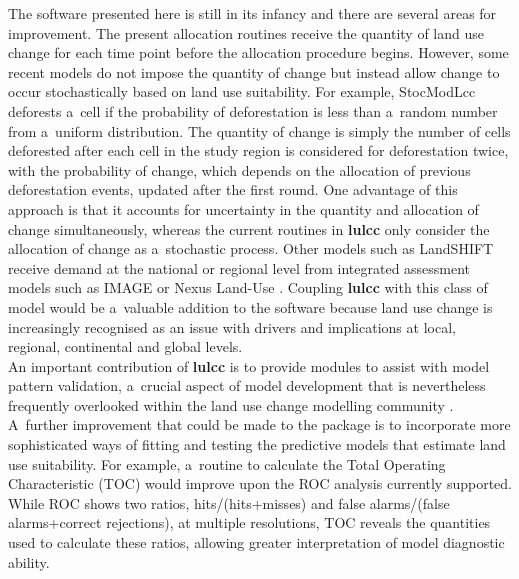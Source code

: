 \documentclass[gmdd, online, hvmath]{copernicus}
\begin{document}
The software presented here is still in its infancy and there are several areas for improvement. The present allocation routines receive the quantity of land use change for each time point before the allocation procedure begins. However, some recent models do not impose the quantity of change but instead allow change to occur stochastically based on land use suitability. For example, StocModLcc \citep{rosa2013} deforests a~cell if the probability of deforestation is less than a~random number from a~uniform distribution. The quantity of change is simply the number of cells deforested after each cell in the study region is considered for deforestation twice, with the probability of change, which depends on the allocation of previous deforestation events, updated after the first round. One advantage of this approach is that it accounts for uncertainty in the quantity and allocation of change simultaneously, whereas the current routines in \textbf{lulcc} only consider the allocation of change as a~stochastic process. Other models such as LandSHIFT \citep{schaldach2011} receive demand at the national or regional level from integrated assessment models such as IMAGE \citep{stehfast2014} or Nexus Land-Use \citep{souty2012}. Coupling \textbf{lulcc} with this class of model would be a~valuable addition to the software because land use change is increasingly recognised as an issue with drivers and implications at local, regional, continental and global levels. \\

An important contribution of \textbf{lulcc} is to provide modules to assist with model pattern validation, a~crucial aspect of model development that is nevertheless frequently overlooked within the land use change modelling community \citep{rosa2014}. A~further improvement that could be made to the package is to incorporate more sophisticated ways of fitting and testing the predictive models that estimate land use suitability. For example, a~routine to calculate the Total Operating Characteristic (TOC) \citep{pontius2014} would improve upon the ROC analysis currently supported. While ROC shows two ratios, hits/(hits+misses) and false alarms/(false alarms+correct rejections), at multiple resolutions, TOC reveals the quantities used to calculate these ratios, allowing greater interpretation of model diagnostic ability. \\
\end{document}
